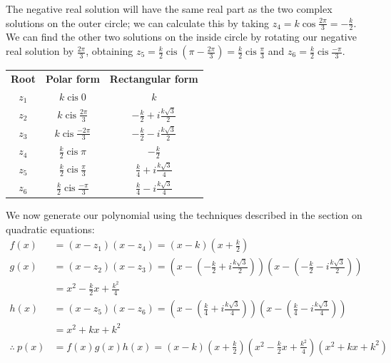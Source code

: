 \documentclass[a4paper,10pt,titlepage]{article}
\theoremstyle{definition}
\DeclareMathOperator{\cis}{cis}
\begin{document}
The negative real solution will have the same real part as the two complex solutions
on the outer circle; we can calculate this by taking $ z_4 = k \cos \frac{2\pi}{3} = -\frac{k}{2} $.
We can find the other two solutions on the inside circle by rotating our negative
real solution by $ \frac{2\pi}{3} $, obtaining $ z_5 = \frac{k}{2} \cis (\pi - \frac{2\pi}{3}) = \frac{k}{2} \cis \frac{\pi}{3} $
and $ z_6 = \frac{k}{2} \cis \frac{-\pi}{3} $.

\begin{center}
\begin{tabular} {c | c | c}
  \textbf{Root} & \textbf{Polar form} & \textbf{Rectangular form}\\
  $ z_1 $ & $ k \cis 0 $                         & $ k $\\
  $ z_2 $ & $ k \cis \frac{2\pi}{3} $            & $ -\frac{k}{2} + i\frac{k\sqrt{3}}{2} $\\
  $ z_3 $ & $ k \cis \frac{-2\pi}{3} $           & $ -\frac{k}{2} - i\frac{k\sqrt{3}}{2} $\\
  $ z_4 $ & $ \frac{k}{2} \cis \pi $             & $ -\frac{k}{2} $\\
  $ z_5 $ & $ \frac{k}{2} \cis \frac{\pi}{3} $   & $ \frac{k}{4} + i\frac{k\sqrt{3}}{4} $\\
  $ z_6 $ & $ \frac{k}{2} \cis \frac{-\pi}{3} $   & $ \frac{k}{4} - i\frac{k\sqrt{3}}{4} $\\
\end{tabular}
\end{center}

We now generate our polynomial using the techniques described in the section on
quadratic equations:
\begin{align*}
  f(x) &= (x - z_1)(x - z_4) = \left(x -k\right)\left(x + \frac{k}{2}\right)\\
  g(x) &= (x - z_2)(x - z_3) = \left(x - \left(-\frac{k}{2} + i\frac{k\sqrt{3}}{2}\right)\right)\left(x - \left(-\frac{k}{2} - i\frac{k\sqrt{3}}{2}\right)\right)\\
       &= x^2 - \frac{k}{2}x + \frac{k^2}{4}\\
  h(x) &= (x - z_5)(x - z_6) = \left(x - \left(\frac{k}{4} + i\frac{k\sqrt{3}}{4}\right)\right)\left(x - \left(\frac{k}{4} - i\frac{k\sqrt{3}}{4}\right)\right)\\
       &= x^2 + kx + k^2\\
  \therefore~p(x) &= f(x)g(x)h(x) = \left(x -k\right)\left(x + \frac{k}{2}\right)\left(x^2 - \frac{k}{2}x + \frac{k^2}{4}\right)\left(x^2 + kx + k^2\right)
\end{align*}
\end{document}
